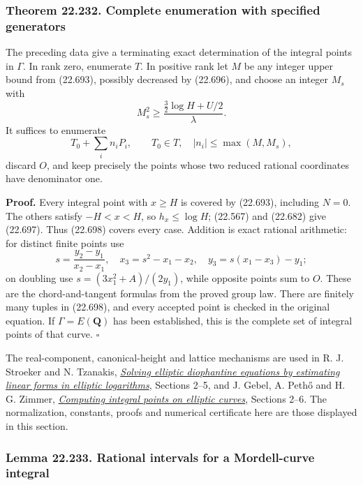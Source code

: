 \documentclass[
  11pt,
  a4paper,
]{article}
\begin{document}
\subsubsection{Theorem 22.232. Complete enumeration with specified
generators}\label{theorem-22.232.-complete-enumeration-with-specified-generators}

The preceding data give a terminating exact determination of the
integral points in \(\Gamma\). In rank zero, enumerate \(T\). In
positive rank let \(M\) be any integer upper bound from (22.693),
possibly decreased by (22.696), and choose an integer \(M_s\) with \[
 M_s^2\ge\frac{\tfrac32\log H+U/2}{\lambda}.
 \tag{22.697}
\] It suffices to enumerate \[
 T_0+\sum_i n_iP_i,\qquad
 T_0\in T,\quad |n_i|\le\max(M,M_s),
 \tag{22.698}
\] discard \(O\), and keep precisely the points whose two reduced
rational coordinates have denominator one.

\textbf{Proof.} Every integral point with \(x\ge H\) is covered by
(22.693), including \(N=0\). The others satisfy \(-H<x<H\), so
\(h_x\le\log H\); (22.567) and (22.682) give (22.697). Thus (22.698)
covers every case. Addition is exact rational arithmetic: for distinct
finite points use \[
 s=\frac{y_2-y_1}{x_2-x_1},\quad
 x_3=s^2-x_1-x_2,\quad y_3=s(x_1-x_3)-y_1;
 \tag{22.699}
\] on doubling use \(s=(3x_1^2+A)/(2y_1)\), while opposite points sum to
\(O\). These are the chord-and-tangent formulas from the proved group
law. There are finitely many tuples in (22.698), and every accepted
point is checked in the original equation. If \(\Gamma=E(\mathbf Q)\)
has been established, this is the complete set of integral points of
that curve. \(\square\)

The real-component, canonical-height and lattice mechanisms are used in
R. J. Stroeker and N. Tzanakis,
\href{https://www.math.uoc.gr/~tzanakis/Papers/Acta94-v2.pdf}{\emph{Solving
elliptic diophantine equations by estimating linear forms in elliptic
logarithms}}, Sections 2--5, and J. Gebel, A. Pethő and H. G. Zimmer,
\href{https://matwbn.icm.edu.pl/ksiazki/aa/aa68/aa6827.pdf}{\emph{Computing
integral points on elliptic curves}}, Sections 2--6. The normalization,
constants, proofs and numerical certificate here are those displayed in
this section.

\subsubsection{Lemma 22.233. Rational intervals for a Mordell-curve
integral}\label{lemma-22.233.-rational-intervals-for-a-mordell-curve-integral}
\end{document}

